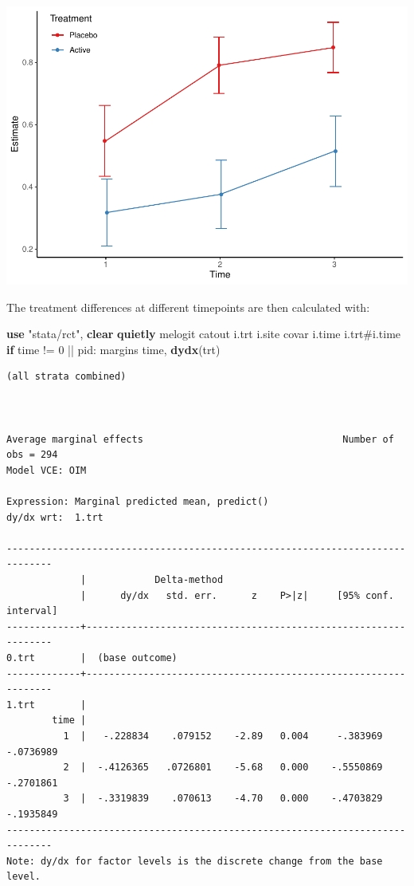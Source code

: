 \documentclass[
]{book}
\newenvironment{Shaded}{\begin{snugshade}}{\end{snugshade}}
\newcommand{\KeywordTok}[1]{\textcolor[rgb]{0.13,0.29,0.53}{\textbf{#1}}}
\newcommand{\NormalTok}[1]{#1}
\newcommand{\StringTok}[1]{\textcolor[rgb]{0.31,0.60,0.02}{#1}}
\begin{document}
\includegraphics{rct-cookbook_files/figure-latex/rmixed4plot_02-1.pdf}

The treatment differences at different timepoints are then calculated with:

\begin{Shaded}
\begin{Highlighting}[]
\KeywordTok{use} \StringTok{"stata/rct"}\NormalTok{, }\KeywordTok{clear}
\KeywordTok{quietly}\NormalTok{ melogit catout i.trt i.site covar i.time i.trt\#i.time }\KeywordTok{if}\NormalTok{ time != 0 || pid:}
\NormalTok{margins time, }\KeywordTok{dydx}\NormalTok{(trt)}
\end{Highlighting}
\end{Shaded}

\begin{verbatim}
(all strata combined)



Average marginal effects                                   Number of obs = 294
Model VCE: OIM

Expression: Marginal predicted mean, predict()
dy/dx wrt:  1.trt

------------------------------------------------------------------------------
             |            Delta-method
             |      dy/dx   std. err.      z    P>|z|     [95% conf. interval]
-------------+----------------------------------------------------------------
0.trt        |  (base outcome)
-------------+----------------------------------------------------------------
1.trt        |
        time |
          1  |   -.228834    .079152    -2.89   0.004     -.383969   -.0736989
          2  |  -.4126365   .0726801    -5.68   0.000    -.5550869   -.2701861
          3  |  -.3319839    .070613    -4.70   0.000    -.4703829   -.1935849
------------------------------------------------------------------------------
Note: dy/dx for factor levels is the discrete change from the base level.
\end{verbatim}
\end{document}
